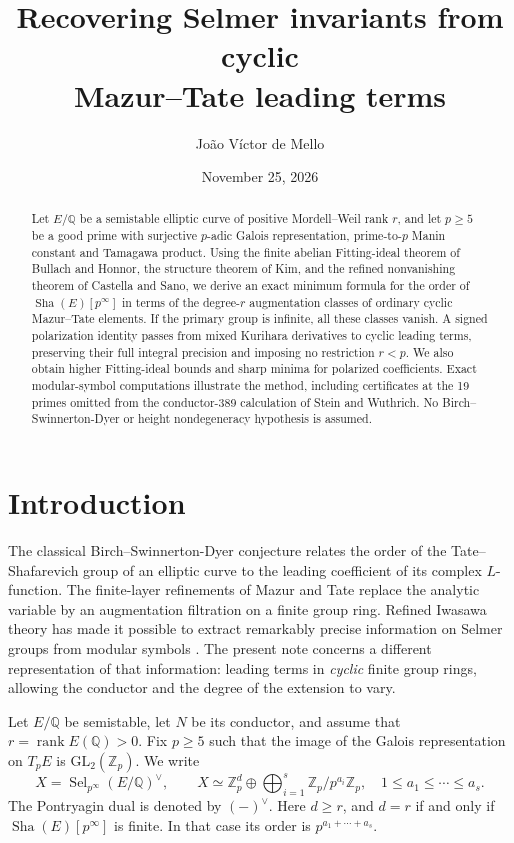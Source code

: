 \documentclass[11pt]{article}
\title{Recovering Selmer invariants from cyclic\\Mazur--Tate leading terms}
\author{Jo\~ao V\'ictor de Mello}
\date{November 25, 2026}
\theoremstyle{remark}\newtheorem{remark}[theorem]{Remark}
\newcommand{\Z}{\mathbb Z}\newcommand{\Q}{\mathbb Q}\newcommand{\F}{\mathbb F}
\newcommand{\Sha}{\operatorname{Sha}}
\newcommand{\Sel}{\operatorname{Sel}}
\newcommand{\rk}{\operatorname{rank}}
\begin{document}
\maketitle
\begin{abstract}
Let $E/\Q$ be a semistable elliptic curve of positive Mordell--Weil rank $r$, and let $p\geq5$ be a good prime with surjective $p$-adic Galois representation, prime-to-$p$ Manin constant and Tamagawa product. Using the finite abelian Fitting-ideal theorem of Bullach and Honnor, the structure theorem of Kim, and the refined nonvanishing theorem of Castella and Sano, we derive an exact minimum formula for the order of $\Sha(E)[p^\infty]$ in terms of the degree-$r$ augmentation classes of ordinary cyclic Mazur--Tate elements. If the primary group is infinite, all these classes vanish. A signed polarization identity passes from mixed Kurihara derivatives to cyclic leading terms, preserving their full integral precision and imposing no restriction $r<p$. We also obtain higher Fitting-ideal bounds and sharp minima for polarized coefficients. Exact modular-symbol computations illustrate the method, including certificates at the 19 primes omitted from the conductor-389 calculation of Stein and Wuthrich. No Birch--Swinnerton-Dyer or height nondegeneracy hypothesis is assumed.
\end{abstract}

\section{Introduction}
The classical Birch--Swinnerton-Dyer conjecture relates the order of the Tate--Shafarevich group of an elliptic curve to the leading coefficient of its complex $L$-function. The finite-layer refinements of Mazur and Tate \cite{MT} replace the analytic variable by an augmentation filtration on a finite group ring. Refined Iwasawa theory has made it possible to extract remarkably precise information on Selmer groups from modular symbols \cite{Kur,Kim}. The present note concerns a different representation of that information: leading terms in \emph{cyclic} finite group rings, allowing the conductor and the degree of the extension to vary.

Let $E/\Q$ be semistable, let $N$ be its conductor, and assume that $r=\rk E(\Q)>0$. Fix $p\geq5$ such that the image of the Galois representation on $T_pE$ is $\mathrm{GL}_2(\Z_p)$. We write
\[
 X=\Sel_{p^\infty}(E/\Q)^\vee,\qquad
 X\simeq \Z_p^d\oplus\bigoplus_{i=1}^{s}\Z_p/p^{a_i}\Z_p,
 \quad 1\leq a_1\leq\cdots\leq a_s.
\]
The Pontryagin dual is denoted by $(-)^\vee$. Here $d\geq r$, and $d=r$ if and only if $\Sha(E)[p^\infty]$ is finite. In that case its order is $p^{a_1+\cdots+a_s}$.
\end{document}
